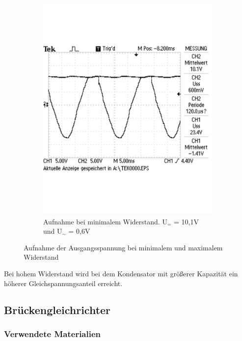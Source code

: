 \documentclass[12pt,a4paper]{article}
\begin{document}
\begin{figure}[H]
\begin{subfigure}[b]{0.48\textwidth}
                \includegraphics[width=\textwidth , scale = 0.4]{2_5_1000F_2.pdf}
                \caption[Aufnahme bei minimalem Widerstand. U$_{=}$ = 10,1V und U$_\sim$ = 0,6V]{Aufnahme bei minimalem Widerstand. U$_{=}$ = 10,1V und U$_\sim$ = 0,6V}
  				\label{fig:2_5_1000F_2}
        \end{subfigure}
        \caption{Aufnahme der Ausgangsspannung bei minimalem und maximalem Widerstand}
        \label{fig:2_5_1000F}
\end{figure}

Bei hohem Widerstand wird bei dem Kondensator mit größerer Kapazität ein höherer Gleichspannungsanteil erreicht.

\subsection{Brückengleichrichter}
\subsubsection{Verwendete Materialien}
\end{document}
